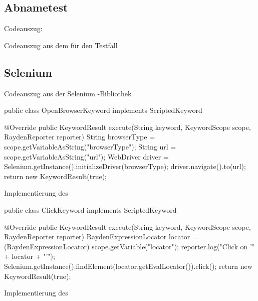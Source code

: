 \subsection{Abnametest }

\begin{program}

\caption{Codeauszug: }
\label{prog:uatest-create}
\end{program}

\begin{program}

\caption{Codeauszug aus dem  für den Testfall }
\label{prog:uatest-find}
\end{program}

\todo

\clearpage

\subsection{Selenium }

\begin{program}

\caption{Codeauszug aus der Selenium -Bibliothek}
\label{prog:selenium}
\end{program}


\begin{program}
\begin{JavaCode}
public class OpenBrowserKeyword implements ScriptedKeyword {

	@Override
	public KeywordResult execute(String keyword, KeywordScope scope, RaydenReporter reporter) {
		String browserType = scope.getVariableAsString("browserType");
		String url = scope.getVariableAsString("url");
		WebDriver driver = Selenium.getInstance().initializeDriver(browserType);
		driver.navigate().to(url);
		return new KeywordResult(true);
	}
}
\end{JavaCode}
\caption{Implementierung des }
\label{prog:openBrowserKeyword}
\end{program}


\begin{program}
\begin{JavaCode}
public class ClickKeyword implements ScriptedKeyword {

  @Override
  public KeywordResult execute(String keyword, KeywordScope scope, RaydenReporter reporter) {
    RaydenExpressionLocator locator = (RaydenExpressionLocator) scope.getVariable("locator");
    reporter.log("Click on '" + locator + "'");
    Selenium.getInstance().findElement(locator.getEvalLocator()).click();
    return new KeywordResult(true);
  }
}
\end{JavaCode}
\caption{Implementierung des }
\label{prog:clickKeyword}
\end{program}



